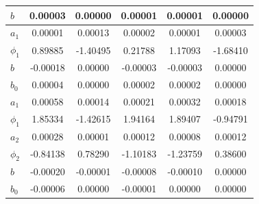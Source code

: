 \begin{table}
\begin{center}
\begin{tabular}{|l|c|c|c|c|c|}
$b$ & 0.00003  & 0.00000  & 0.00001  & 0.00001  & 0.00000  \\
\hline
$a_1$ & 0.00001  & 0.00013  & 0.00002  & 0.00001  & 0.00003  \\
$\phi_1$ & 0.89885  & -1.40495  & 0.21788  & 1.17093  & -1.68410  \\
$b$ & -0.00018  & 0.00000  & -0.00003  & -0.00003  & 0.00000  \\
$b_0$ & 0.00004  & 0.00000  & 0.00002  & 0.00002  & 0.00000  \\
\hline
$a_1$ & 0.00058  & 0.00014  & 0.00021  & 0.00032  & 0.00018  \\
$\phi_1$ & 1.85334  & -1.42615  & 1.94164  & 1.89407  & -0.94791  \\
$a_2$ & 0.00028  & 0.00001  & 0.00012  & 0.00008  & 0.00012  \\
$\phi_2$ & -0.84138  & 0.78290  & -1.10183  & -1.23759  & 0.38600  \\
$b$ & -0.00020  & -0.00001  & -0.00008  & -0.00010  & 0.00000  \\
$b_0$ & -0.00006  & 0.00000  & -0.00001  & 0.00000  & 0.00000  \\
\hline
\hline
\end{tabular}
\end{center}
\end{table}

